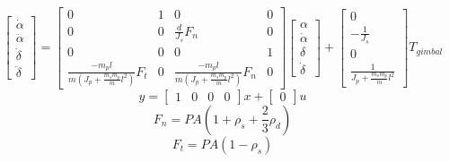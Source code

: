 \documentclass[]{aiaa-tc}%
\begin{document}
	\begin{equation}
\begin{bmatrix}
\dot{\alpha }\\ 
\ddot{\alpha}\\ 
\dot{\delta }\\ 
\ddot{\delta }
\end{bmatrix}=\begin{bmatrix}
0 & 1 & 0 & 0\\ 
0 & 0 & \frac{d}{J_s}F_n & 0\\ 
0 & 0 & 0 & 1\\ 
\frac{-m_pl}{m(J_p+\frac{m_sm_p}{m}l^2)}F_t & 0 & \frac{-m_pl}{m(J_p+\frac{m_sm_p}{m}l^2)}F_n & 0
\end{bmatrix}
\begin{bmatrix}
\alpha\\ 
\dot{\alpha}\\ 
\delta\\ 
\dot{\delta }
\end{bmatrix}
+
\begin{bmatrix}
0\\ 
-\frac{1}{J_s}\\ 
0\\ 
\frac{1}{J_p+\frac{m_sm_p}{m}l^{2}}
\end{bmatrix}T_{gimbal}
	\end{equation}
	\begin{equation}
y = \begin{bmatrix}
1 & 0 & 0 & 0
\end{bmatrix}x+\begin{bmatrix}
0
\end{bmatrix}u
	\end{equation}
	\begin{equation}
F_n=PA(1+\rho_s+\frac{2}{3}\rho_d)
	\end{equation}
	\begin{equation}
F_t=PA(1-\rho_s)
	\end{equation}
	
\end{document}
